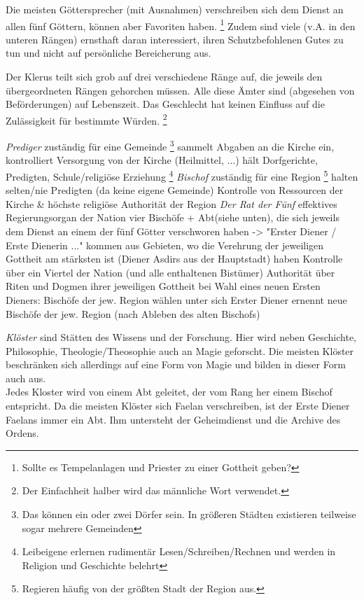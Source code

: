 Die meisten Göttersprecher (mit Ausnahmen) verschreiben sich dem Dienst an allen fünf Göttern, können aber Favoriten haben. 
\footnote{Sollte es Tempelanlagen und Priester zu einer Gottheit geben?}
Zudem sind viele (v.A. in den unteren Rängen) ernsthaft daran interessiert, ihren Schutzbefohlenen Gutes zu tun und nicht auf persönliche Bereicherung aus.

Der Klerus teilt sich grob auf drei verschiedene Ränge auf, die jeweils den übergeordneten Rängen gehorchen müssen. 
Alle diese Ämter sind (abgesehen von Beförderungen) auf Lebenszeit.
Das Geschlecht hat keinen Einfluss auf die Zulässigkeit für bestimmte Würden.
\footnote{Der Einfachheit halber wird das männliche Wort verwendet.}
\begin{outline}
	\1 \emph{Prediger}
		\2 zuständig für eine Gemeinde
		\footnote{Das können ein oder zwei Dörfer sein. In größeren Städten existieren teilweise sogar mehrere Gemeinden}
		\2 sammelt Abgaben an die Kirche ein, kontrolliert Versorgung von der Kirche (Heilmittel, ...)
		\2 hält Dorfgerichte, Predigten, Schule/religiöse Erziehung
		\footnote{Leibeigene erlernen rudimentär Lesen/Schreiben/Rechnen und werden in Religion und Geschichte belehrt}
	\1 \emph{Bischof}
		\2 zuständig für eine Region
		\footnote{Regieren häufig von der größten Stadt der Region aus.}
		\2 halten selten/nie Predigten (da keine eigene Gemeinde)
		\2 Kontrolle von Ressourcen der Kirche \& höchste religiöse Authorität der Region
	\1 \emph{Der Rat der Fünf}
		\2 effektives Regierungsorgan der Nation 
		\2 vier Bischöfe + Abt(siehe unten), die sich jeweils dem Dienst an einem der fünf Götter verschworen haben -> "Erster Diener / Erste Dienerin ..."
		\2 kommen aus Gebieten, wo die Verehrung der jeweiligen Gottheit am stärksten ist (Diener Asdirs aus der Hauptstadt)
		\2 haben Kontrolle über ein Viertel der Nation (und alle enthaltenen Bistümer)
		\2 Authorität über Riten und Dogmen ihrer jeweiligen Gottheit
		\2 bei Wahl eines neuen Ersten Dieners: Bischöfe der jew. Region wählen unter sich
		\2 Erster Diener ernennt neue Bischöfe der jew. Region (nach Ableben des alten Bischofs)
\end{outline}
\emph{Klöster} sind Stätten des Wissens und der Forschung. Hier wird neben Geschichte, Philosophie, Theologie/Theosophie auch an Magie geforscht. 
Die meisten Klöster beschränken sich allerdings auf eine Form von Magie und bilden in dieser Form auch aus.\\
Jedes Kloster wird von einem Abt geleitet, der vom Rang her einem Bischof entspricht. 
Da die meisten Klöster sich Faelan verschreiben, ist der Erste Diener Faelans immer ein Abt. 
Ihm untersteht der Geheimdienst und die Archive des Ordens.

